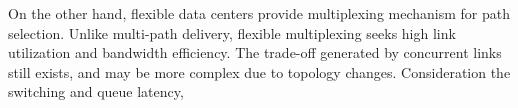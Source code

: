 \documentclass[journal,onecolumn,11pt]{IEEEtran}
\begin{document}
On the other hand, flexible data centers provide multiplexing mechanism for path selection. Unlike multi-path delivery, flexible multiplexing seeks high link utilization and bandwidth efficiency. The trade-off generated by concurrent links still exists, and may be more complex due to topology changes. Consideration the switching and queue latency,


%
%
%
\end{document}
